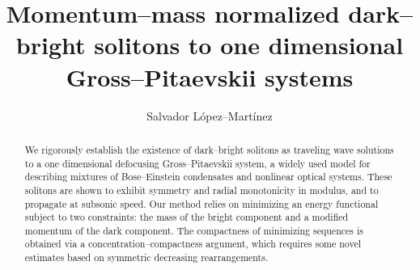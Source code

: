 \documentclass[11pt]{article}
\theoremstyle{plain}
\theoremstyle{definition}
\theoremstyle{remark}
\numberwithin{equation}{section}
\begin{document}
	\title{Momentum--mass normalized dark--bright solitons to one dimensional Gross--Pitaevskii systems}                                 
	\author{
		\renewcommand{\thefootnote}{\arabic{footnote}}
		Salvador  L\'opez--Mart\'inez\footnotemark[1]}
	\date{}
	\maketitle
	
	
	
	
	\begin{abstract}
    	We rigorously establish the existence of dark--bright solitons as traveling wave solutions to a one dimensional defocusing Gross--Pitaevskii system, a widely used model for describing mixtures of Bose--Einstein condensates and nonlinear optical systems. These solitons are shown to exhibit symmetry and radial monotonicity in modulus, and to propagate at subsonic speed. Our method relies on minimizing an energy functional subject to two constraints: the mass of the bright component and a modified momentum of the dark component. The compactness of minimizing sequences is obtained via a concentration--compactness argument, which requires some novel estimates based on symmetric decreasing rearrangements.
	\end{abstract}   
	
	\maketitle
	
\end{document}
